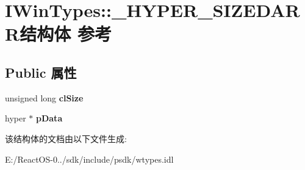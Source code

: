 \hypertarget{struct_i_win_types_1_1___h_y_p_e_r___s_i_z_e_d_a_r_r}{}\section{I\+Win\+Types\+:\+:\+\_\+\+H\+Y\+P\+E\+R\+\_\+\+S\+I\+Z\+E\+D\+A\+R\+R结构体 参考}
\label{struct_i_win_types_1_1___h_y_p_e_r___s_i_z_e_d_a_r_r}
\subsection*{Public 属性}
\begin{DoxyCompactItemize}
\item 
\mbox{\label{struct_i_win_types_1_1___h_y_p_e_r___s_i_z_e_d_a_r_r_a2cd18c362092c9ba96b609847f84d182}} 
unsigned long {\bfseries cl\+Size}
\item 
\mbox{\label{struct_i_win_types_1_1___h_y_p_e_r___s_i_z_e_d_a_r_r_a24ca7c152693017fdae9ae22d44f25e7}} 
hyper $\ast$ {\bfseries p\+Data}
\end{DoxyCompactItemize}


该结构体的文档由以下文件生成\+:\begin{DoxyCompactItemize}
\item 
E\+:/\+React\+O\+S-\/0../sdk/include/psdk/wtypes.\+idl\end{DoxyCompactItemize}
